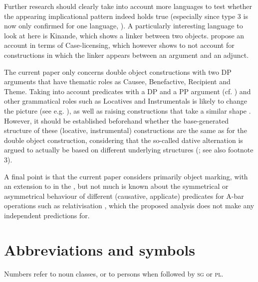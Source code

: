 \documentclass[output=paper]{LSP/langsci}
\begin{document}
Further research should clearly take into account more  languages to test whether the appearing implicational pattern indeed holds true (especially since type 3 is now only confirmed for one language, ). A particularly interesting language to look at here is Kinande, which shows a linker between two objects. \citet{BakerCollins2006} propose an account in terms of Case-licensing, which however \citet{SchneiderZioga2014} shows to not account for constructions in which the linker appears between an argument and an adjunct.

The current paper only concerns double object constructions with two DP arguments that have thematic roles as Causee, Benefactive, Recipient and Theme. Taking into account predicates with a DP and a PP argument (cf. \citealt{Bruening2010,Jeong2007,BakerKramer2016}) and other grammatical roles such as Locatives and Instrumentals is likely to change the picture (see e.g.
\citealt{Baker1988,GerdtsWhaley1991,GerdtsWhaley1992,Marantz1993,AlsinaMchombo1993,Ngonyani1996,Ngonyani1998,Simango1995,Nakamura1997,Ngoboka2005,Ngoboka2016,ZellerNgoboka2006,Jerro2015}%
), 
as well as  raising constructions that take a similar shape \citep{Simango2007,MorolongHyman1977}. However, it should be established beforehand whether the base-generated structure of these (locative, instrumental) constructions are the same as for the double object construction, considering that the so-called dative alternation is argued to actually be based on different underlying structures (\citealt{Pesetsky1995,Harley2002,Bruening2010}; see also footnote 3).

A final point is that the current paper considers primarily object marking, with an extension to  in the , but not much is known about the symmetrical or asymmetrical behaviour of different (causative, applicate) predicates for A-bar operations such as relativisation \citep{Nakamura1997}, which the proposed analysis does not make any independent predictions for.
 

\section*{Abbreviations and symbols}
Numbers refer to noun classes, or to persons when followed by \textsc{sg} or \textsc{pl}.
\end{document}
